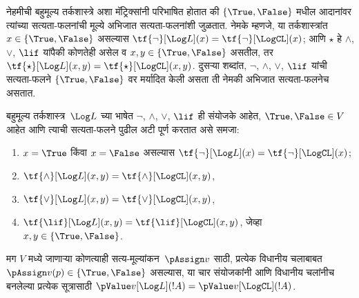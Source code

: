 \documentclass[../../../include/open-logic-section]{subfiles}
\begin{document}


नेहमीची बहुमूल्य तर्कशास्त्रे अशा मॅट्रिक्सांनी परिभाषित होतात की
$\{\True, \False\}$ मधील आदानांवर त्यांच्या सत्यता-फलनांची मूल्ये
अभिजात सत्यता-फलनांशी जुळतात. नेमके म्हणजे, या तर्कशास्त्रांत
$x \in \{\True, \False\}$ असल्यास $\tf{\lnot}[\Log L](x) =
\tf{\lnot}[\LogCL](x)$; आणि $\star$ हे $\land$, $\lor$,
$\lif$ यांपैकी कोणतेही असेल व $x, y \in \{\True, \False\}$
असतील, तर $\tf{\star}[\Log L](x,y) =
\tf{\star}[\LogCL](x,y)$. दुसऱ्या शब्दांत,
$\lnot$, $\land$, $\lor$, $\lif$ यांची सत्यता-फलने
$\{\True,\False\}$ वर मर्यादित केली असता ती नेमकी
अभिजात सत्यता-फलनेच असतात.

\begin{prop}
  बहुमूल्य तर्कशास्त्र~$\Log L$ च्या भाषेत
  $\lnot$, $\land$, $\lor$, $\lif$ ही संयोजके आहेत,
  $\True, \False \in V$ आहेत आणि त्याची सत्यता-फलने
  पुढील अटी पूर्ण करतात असे समजा:
  \begin{enumerate}
    \item{} $x = \True$ किंवा $x = \False$
    असल्यास $\tf{\lnot}[\Log L](x) = \tf{\lnot}[\LogCL](x)$;
    \item{} $\tf{\land}[\Log L](x,y) = \tf{\land}[\LogCL](x,y)$,
    \item{} $\tf{\lor}[\Log L](x,y) = \tf{\lor}[\LogCL](x,y)$,
    \item{} $\tf{\lif}[\Log L](x,y) = \tf{\lif}[\LogCL](x,y)$,
    जेव्हा $x, y \in \{\True, \False\}$.
  \end{enumerate}
  मग $V$ मध्ये जाणाऱ्या कोणत्याही सत्य-मूल्यांकन~$\pAssign v$
  साठी, प्रत्येक विधानीय चलाबाबत $\pAssign
  v(p) \in \{\True,\False\}$ असल्यास,
  या चार संयोजकांनी आणि विधानीय चलांनीच बनलेल्या प्रत्येक
  सूत्रासाठी $\pValue v[\Log L](!A) = \pValue
  v[\LogCL](!A)$.
\end{prop}
\end{document}
